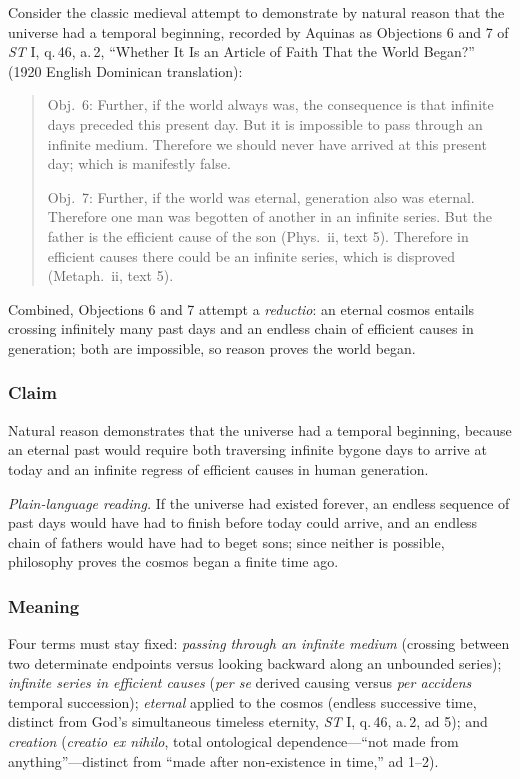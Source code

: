 Consider the classic medieval attempt to demonstrate by natural reason that the universe had a temporal beginning, recorded by Aquinas as Objections 6 and 7 of \emph{ST} I, q.\,46, a.\,2, ``Whether It Is an Article of Faith That the World Began?'' (1920 English Dominican translation):

\begin{quote}
Obj.\ 6: Further, if the world always was, the consequence is that infinite days preceded this present day. But it is impossible to pass through an infinite medium. Therefore we should never have arrived at this present day; which is manifestly false.

Obj.\ 7: Further, if the world was eternal, generation also was eternal. Therefore one man was begotten of another in an infinite series. But the father is the efficient cause of the son (Phys.\ ii, text 5). Therefore in efficient causes there could be an infinite series, which is disproved (Metaph.\ ii, text 5).
\end{quote}

Combined, Objections 6 and 7 attempt a \emph{reductio}: an eternal cosmos entails crossing infinitely many past days and an endless chain of efficient causes in generation; both are impossible, so reason proves the world began.

\subsubsection*{Claim}

Natural reason demonstrates that the universe had a temporal beginning, because an eternal past would require both traversing infinite bygone days to arrive at today and an infinite regress of efficient causes in human generation.

\emph{Plain-language reading.} If the universe had existed forever, an endless sequence of past days would have had to finish before today could arrive, and an endless chain of fathers would have had to beget sons; since neither is possible, philosophy proves the cosmos began a finite time ago.

\subsubsection*{Meaning}

Four terms must stay fixed: \emph{passing through an infinite medium} (crossing between two determinate endpoints versus looking backward along an unbounded series); \emph{infinite series in efficient causes} (\emph{per se} derived causing versus \emph{per accidens} temporal succession); \emph{eternal} applied to the cosmos (endless successive time, distinct from God's simultaneous timeless eternity, \emph{ST} I, q.\,46, a.\,2, ad 5); and \emph{creation} (\emph{creatio ex nihilo}, total ontological dependence---``not made from anything''---distinct from ``made after non-existence in time,'' ad 1--2).

